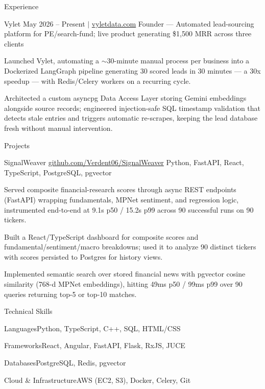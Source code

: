 \documentclass[
	11pt
]{../../../template}
\begin{document}
\begin{rSection}{E}{xperience}
		\begin{rSectionEntry}
			{Vylet}
			{May 2026 -- Present $\vert$ \href{https://vyletdata.com}{vyletdata.com}}
			{Founder --- Automated lead-sourcing platform for PE/search-fund; live product generating \$1,500 MRR across three clients}
			{}
			{}

			\item Launched Vylet, automating a $\sim$30-minute manual process per business into a Dockerized LangGraph pipeline generating 30 scored leads in 30 minutes --- a 30x speedup --- with Redis/Celery workers on a recurring cycle.
			\item Architected a custom asyncpg Data Access Layer storing Gemini embeddings alongside source records; engineered injection-safe SQL timestamp validation that detects stale entries and triggers automatic re-scrapes, keeping the lead database fresh without manual intervention.
		\end{rSectionEntry}
	\end{rSection}

	\begin{rSection}{P}{rojects}
		\begin{rSectionEntry}
			{SignalWeaver}
			{\href{https://github.com/Verdent06/SignalWeaver}{github.com/Verdent06/SignalWeaver}}
			{}
			{Python, FastAPI, React, TypeScript, PostgreSQL, pgvector}
			{}

			\item Served composite financial-research scores through async REST endpoints (FastAPI) wrapping fundamentals, MPNet sentiment, and regression logic, instrumented end-to-end at 9.1s p50 / 15.2s p99 across 90 successful runs on 90 tickers.
			\item Built a React/TypeScript dashboard for composite scores and fundamental/sentiment/macro breakdowns; used it to analyze 90 distinct tickers with scores persisted to Postgres for history views.
			\item Implemented semantic search over stored financial news with pgvector cosine similarity (768-d MPNet embeddings), hitting 49ms p50 / 99ms p99 over 90 queries returning top-5 or top-10 matches.
		\end{rSectionEntry}
	\end{rSection}

	\begin{rSection}{T}{echnical Skills}
		\begin{rSet}{Languages}{Python, TypeScript, C++, SQL, HTML/CSS}
		\end{rSet}
		\begin{rSet}{Frameworks}{React, Angular, FastAPI, Flask, RxJS, JUCE}
		\end{rSet}
		\begin{rSet}{Databases}{PostgreSQL, Redis, pgvector}
		\end{rSet}
		\begin{rSet}{Cloud \& Infrastructure}{AWS (EC2, S3), Docker, Celery, Git}
		\end{rSet}
	\end{rSection}
\end{document}
